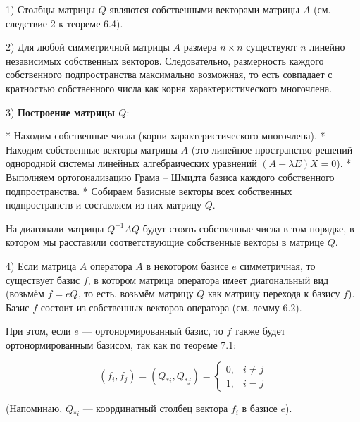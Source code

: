 {1) Столбцы матрицы \( Q \) являются собственными векторами матрицы \( A \) (см. следствие 2 к теореме 6.4).

2) Для любой симметричной матрицы \( A \) размера \( n \times n \) существуют \( n \) линейно независимых собственных векторов. Следовательно, размерность каждого собственного подпространства максимально возможная, то есть совпадает с кратностью собственного числа как корня характеристического многочлена.

3) \textbf{Построение матрицы \( Q \)}:

   * Находим собственные числа (корни характеристического многочлена).
   * Находим собственные векторы матрицы \( A \) (это линейное пространство решений однородной системы линейных алгебраических уравнений \( (A - \lambda E)X = 0 \)).
   * Выполняем ортогонализацию Грама – Шмидта базиса каждого собственного подпространства.
   * Собираем базисные векторы всех собственных подпространств и составляем из них матрицу \( Q \).

На диагонали матрицы \( Q^{-1}AQ \) будут стоять собственные числа в том порядке, в котором мы расставили соответствующие собственные векторы в матрице \( Q \).

4) Если матрица \( A \) оператора \( A \) в некотором базисе \( e \) симметричная, то существует базис \( f \), в котором матрица оператора имеет диагональный вид (возьмём \( f = e Q \), то есть, возьмём матрицу \( Q \) как матрицу перехода к базису \( f \)). Базис \( f \) состоит из собственных векторов оператора (см. лемму 6.2).

При этом, если \( e \) — ортонормированный базис, то \( f \) также будет ортонормированным базисом, так как по теореме 7.1:



\[
(f_i, f_j) = (Q_{*i}, Q_{*j}) =
\begin{cases} 
0, & i \neq j \\
1, & i = j
\end{cases}
\]



(Напоминаю, \( Q_{*i} \) — координатный столбец вектора \( f_i \) в базисе \( e \)).


}